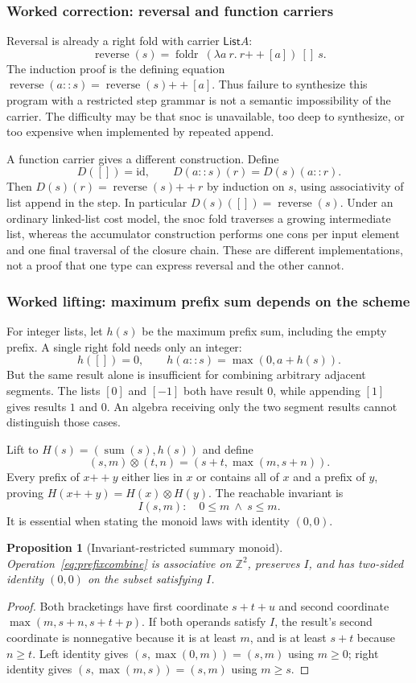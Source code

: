 \documentclass[11pt,a4paper]{article}
\newtheorem{proposition}[theorem]{Proposition}
\theoremstyle{definition}
\theoremstyle{remark}
\newcommand{\Z}{\mathbb{Z}}
\newcommand{\List}{\mathsf{List}}
\newcommand{\foldr}{\operatorname{foldr}}
\newcommand{\rev}{\operatorname{reverse}}
\newcommand{\cat}{\mathbin{+\!+}}
\begin{document}
\subsubsection*{Worked correction: reversal and function carriers}
Reversal is already a right fold with carrier $\List A$:
\[
 \rev(s)=\foldr\ (\lambda a\ r.\ r\cat[a])\ []\ s.
 \tag{8}\label{eq:reversefold}
\]
The induction proof is the defining equation
$\rev(a::s)=\rev(s)\cat[a]$. Thus failure to synthesize this program with a
restricted step grammar is not a semantic impossibility of the carrier.
The difficulty may be that snoc is unavailable, too deep to synthesize, or too
expensive when implemented by repeated append.

A function carrier gives a different construction. Define
\[
 D([])=\mathrm{id},\qquad
 D(a::s)(r)=D(s)(a::r).
 \tag{9}\label{eq:reverseacc}
\]
Then $D(s)(r)=\rev(s)\cat r$ by induction on $s$, using associativity of list
append in the step. In particular $D(s)([])=\rev(s)$. Under an ordinary
linked-list cost model, the snoc fold traverses a growing intermediate list,
whereas the accumulator construction performs one cons per input element and
one final traversal of the closure chain. These are different implementations,
not a proof that one type can express reversal and the other cannot.

\subsubsection*{Worked lifting: maximum prefix sum depends on the scheme}
For integer lists, let $h(s)$ be the maximum prefix sum, including the empty
prefix. A single right fold needs only an integer:
\[
 h([])=0,\qquad h(a::s)=\max(0,a+h(s)).
 \tag{10}
\]
But the same result alone is insufficient for combining arbitrary adjacent
segments. The lists $[0]$ and $[-1]$ both have result $0$, while appending $[1]$
gives results $1$ and $0$. An algebra receiving only the two segment results
cannot distinguish those cases.

Lift to $H(s)=(\operatorname{sum}(s),h(s))$ and define
\[
 (s,m)\otimes(t,n)=(s+t,\max(m,s+n)).
 \tag{11}\label{eq:prefixcombine}
\]
Every prefix of $x\cat y$ either lies in $x$ or contains all of $x$ and a prefix
of $y$, proving $H(x\cat y)=H(x)\otimes H(y)$. The reachable invariant is
\[
 I(s,m):\quad 0\le m\ \land\ s\le m.
 \tag{12}\label{eq:prefixinv}
\]
It is essential when stating the monoid laws with identity $(0,0)$.

\begin{proposition}[Invariant-restricted summary monoid]
Operation~\eqref{eq:prefixcombine} is associative on $\Z^2$, preserves $I$, and
has two-sided identity $(0,0)$ on the subset satisfying $I$.
\end{proposition}
\begin{proof}
Both bracketings have first coordinate $s+t+u$ and second coordinate
$\max(m,s+n,s+t+p)$. If both operands satisfy $I$, the result's second coordinate
is nonnegative because it is at least $m$, and is at least $s+t$ because
$n\ge t$. Left identity gives $(s,\max(0,m))=(s,m)$ using $m\ge0$; right identity
gives $(s,\max(m,s))=(s,m)$ using $m\ge s$.
\end{proof}
\end{document}
